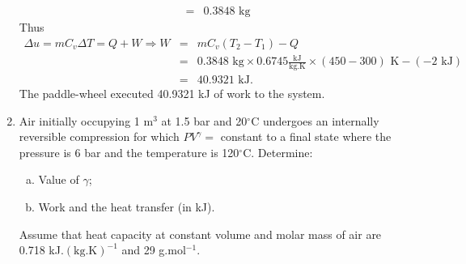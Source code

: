\documentclass[12pts,a4paper,amsmath,amssymb,floatfix]{article}%
\newcommand{\frc}{\displaystyle\frac}
\begin{document}
\begin{enumerate}[1)]
\begin{eqnarray}
                                                      &=& 0.3848\text{ kg}\nonumber
       \end{eqnarray}
       Thus
       \begin{eqnarray}
          \Delta u = m C_{v}\Delta T = Q + W \Rightarrow W &=& m C_{v}\left(T_{2}-T_{1}\right) - Q \nonumber \\
                                                          &=& 0.3848\text{ kg} \times 0.6745 \frc{\text{kJ}}{\text{kg.K}}\times (450-300)\text{ K} - (-2 \text{ kJ}) \nonumber \\
                                                          &=& 40.9321\text{ kJ}. \nonumber
       \end{eqnarray}
       The paddle-wheel executed 40.9321 kJ of work to the system.

\clearpage
   \item  Air initially occupying 1 m$^{3}$ at 1.5 bar and 20$^{\circ}$C undergoes an internally reversible compression for which $P V^{\gamma}=$ constant to a final state where the pressure is 6 bar and the temperature is 120$^{\circ}$C. Determine:
        \begin{enumerate}[(a)]
           \item Value of $\gamma$;
           \item Work and the heat transfer (in kJ).
       \end{enumerate}
       Assume that heat capacity at constant volume and molar mass of air are 0.718 kJ.$\left(\text{kg.K}\right)^{-1}$ and 29 g.mol$^{-1}$. 


\end{enumerate}
\end{document}
